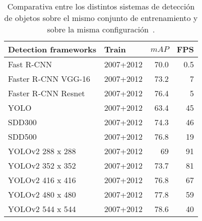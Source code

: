 \begin{table}
  \begin{center}
  \caption[Comparativa entre los distintos sistemas de detección de objetos]{Comparativa entre los distintos sistemas de detección de objetos sobre el mismo conjunto de entrenamiento y sobre la misma configuración~\cite{yolov2}.}
    \label{tabla:comparativa_yolo}
    \begin{tabular}{@{} l l r r@{}}
      \toprule
        \textbf{Detection frameworks}  & \textbf{Train} & \textbf{$mAP$} & \textbf{FPS} \\
      \midrule
        Fast R-CNN                     & 2007+2012      & 70.0           & 0.5 \\
        Faster R-CNN VGG-16                            & 2007+2012      & 73.2           & 7 \\
      Faster R-CNN Resnet                            & 2007+2012      & 76.4           & 5 \\
      YOLO                            & 2007+2012      & 63.4          & 45 \\
      SDD300                            & 2007+2012      & 74.3           & 46 \\
      SDD500                            & 2007+2012      & 76.8           & 19 \\\hline
      YOLOv2 288 x 288                            & 2007+2012      & 69           & 91 \\
      YOLOv2 352 x 352                            & 2007+2012      & 73.7           & 81 \\
      YOLOv2 416 x 416                            & 2007+2012      & 76.8           & 67 \\
      YOLOv2 480 x 480                            & 2007+2012      & 77.8           & 59 \\
      YOLOv2 544 x 544                            & 2007+2012      & 78.6           & 40 \\
      \bottomrule
    \end{tabular}
  \end{center}
\end{table}



